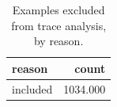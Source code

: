 \begin{table}[htbp]
\caption{Examples excluded from trace analysis, by reason.}
\label{tab:task2_exclusions}
\begin{tabular}{lr}
\toprule
reason & count \\
\midrule
included & 1034.000 \\
\bottomrule
\end{tabular}
\end{table}
